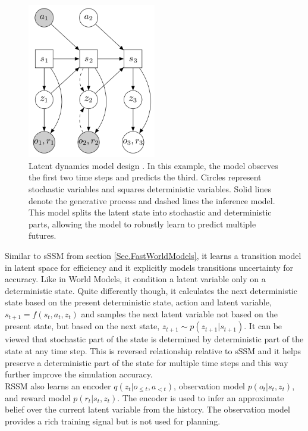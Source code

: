 \begin{figure}[H]
\includegraphics[width=0.5\textwidth,keepaspectratio]{figures/PlaNet/model.png}
\caption[PlaNet latent dynamics model design]{Latent dynamics model design \protect\cite{Algo.PlaNet}. In this example, the model observes the first two time steps and predicts the third. Circles represent stochastic variables and squares deterministic variables. Solid lines denote the generative process and dashed lines the inference model. This model splits the latent state into stochastic and deterministic parts, allowing the model to robustly learn to predict multiple futures.}
\label{Fig.PlaNetModelDesigne}
\end{figure}

Similar to sSSM from section \ref{Sec.FastWorldModels}, it learns a transition model in latent space for efficiency and it explicitly models transitions uncertainty for accuracy. Like in World Models, it condition a latent variable only on a deterministic state. Quite differently though, it calculates the next deterministic state based on the present deterministic state, action and latent variable, $s_{t+1} = f(s_t, a_t, z_t)$ and samples the next latent variable not based on the present state, but based on the next state, $z_{t+1} \sim p(z_{t+1}|s_{t+1})$. It can be viewed that stochastic part of the state is determined by deterministic part of the state at any time step. This is reversed relationship relative to sSSM and it helps preserve a deterministic part of the state for multiple time steps and this way further improve the simulation accuracy. \\
RSSM also learns an encoder $q(z_t | o_{\leqslant t}, a_{< t})$, observation model $p(o_t | s_t, z_t)$, and reward model $p(r_t | s_t, z_t)$. The encoder is used to infer an approximate belief over the current latent variable from the history. The observation model provides a rich training signal but is not used for planning.

